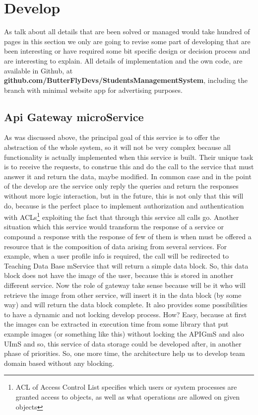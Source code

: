 \chapter{Develop}

As talk about all details that are been solved or managed would take hundred of
pages in this section we only are going to revise some part of developing that
are been interesting or have required some bit specific design or decision process
and are interesting to explain.
\intro
All details of implementation and the own code, are available in Github, at
\textbf{github.com/ButterFlyDevs/StudentsManagementSystem}, including the branch
with minimal website app for advertising purposes.

\section{Api Gateway microService}

As was discussed above, the principal goal of this service is to offer the
abstraction of the whole system, so it will not be very complex because all
functionality is actually implemented when this service is built.
\intro
Their unique task is to receive the requests, to construe this and do the call
to the service that must answer it and return the data,
maybe modified.
In common case and in the point of the develop are the service only
reply the queries and return the responses without more logic interaction, but
in the future, this is not only that this will do, because is the perfect place
to implement authorization and authentication with ACLs\footnote{ACL of Access Control List
specifies which users or system processes are granted access to objects, as well
as what operations are allowed on given objects} exploiting the fact that through
this service all calls go.
\intro
Another situation which this service would transform the response of a service or
compound a response with the response of few of them is when must be offered a
resource that is the composition of data arising from several services. For example,
when a user profile info is required, the call will be redirected to Teaching Data
Base mService that will return a simple data block. So, this data block does not
have the image of the user, because this is stored in another different service.
Now the role of gateway take sense because will be it who will retrieve the image
from other service, will insert it in the data block (by some way) and will return
the data block complete.
\intro
It also provides some possibilities to have a dynamic and not locking develop process.
How? Easy, because at first the images can be extracted in execution time from some
library that put example images (or something like this) without locking the APIGmS
and also UImS and so, this service of data storage could be developed after, in another
phase of priorities. So, one more time, the architecture help us to develop team domain
based without any blocking.


